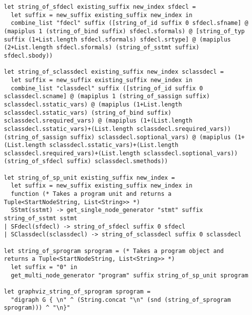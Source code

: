 \documentclass{article}
\begin{document}
\begin{verbatim}
let string_of_sfdecl existing_suffix new_index sfdecl =
  let suffix = new_suffix existing_suffix new_index in
  combine_list "fdecl" suffix ([string_of_id suffix 0 sfdecl.sfname] @ (mapiplus 1 (string_of_bind suffix) sfdecl.sformals) @ [string_of_typ suffix (1+List.length sfdecl.sformals) sfdecl.srtype] @ (mapiplus (2+List.length sfdecl.sformals) (string_of_sstmt suffix) sfdecl.sbody))

let string_of_sclassdecl existing_suffix new_index sclassdecl =
  let suffix = new_suffix existing_suffix new_index in
  combine_list "classdecl" suffix ([string_of_id suffix 0 sclassdecl.scname] @ (mapiplus 1 (string_of_sassign suffix) sclassdecl.sstatic_vars) @ (mapiplus (1+List.length sclassdecl.sstatic_vars) (string_of_bind suffix) sclassdecl.srequired_vars) @ (mapiplus (1+(List.length sclassdecl.sstatic_vars)+(List.length sclassdecl.srequired_vars)) (string_of_sassign suffix) sclassdecl.soptional_vars) @ (mapiplus (1+(List.length sclassdecl.sstatic_vars)+(List.length sclassdecl.srequired_vars)+(List.length sclassdecl.soptional_vars)) (string_of_sfdecl suffix) sclassdecl.smethods))

let string_of_sp_unit existing_suffix new_index =
  let suffix = new_suffix existing_suffix new_index in
  function (* Takes a program unit and returns a Tuple<StartNodeString, List<String>> *)
  SStmt(sstmt) -> get_single_node_generator "stmt" suffix string_of_sstmt sstmt
| SFdecl(sfdecl) -> string_of_sfdecl suffix 0 sfdecl
| SClassdecl(sclassdecl) -> string_of_sclassdecl suffix 0 sclassdecl

let string_of_sprogram sprogram = (* Takes a program object and returns a Tuple<StartNodeString, List<String>> *)
  let suffix = "0" in
  get_multi_node_generator "program" suffix string_of_sp_unit sprogram

let graphviz_string_of_sprogram sprogram =
  "digraph G { \n" ^ (String.concat "\n" (snd (string_of_sprogram sprogram))) ^ "\n}"
\end{verbatim}
\end{document}
